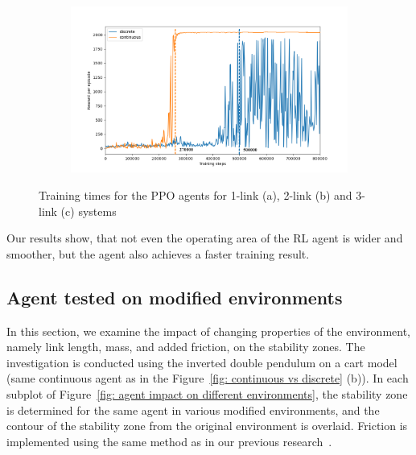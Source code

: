 \begin{figure}[h!]
\begin{subfigure}[t]{0.48\textwidth}
		\label{fig: dp - training time}
		\caption{}
	\end{subfigure}
	\begin{subfigure}[t]{0.48\textwidth}
		\centering
		\includegraphics[width=\textwidth]{Figures/TP_discrete_vs_continuous_training_time.png}
		\label{fig: tp - training time}
		\caption{}
	\end{subfigure}
	
	\caption{Training times for the PPO agents for 1-link (a), 2-link (b) and 3-link (c) systems}
	\label{fig: training time comparison}
\end{figure}

Our results show, that not even the operating area of the RL agent is wider and smoother, but the agent also achieves a faster training result. 

\subsection{Agent tested on modified environments} \label{subsec: Agent tested on modified environments}
In this section, we examine the impact of changing properties of the environment, namely
link length, mass, and added friction, on the stability zones. The investigation is conducted
using the inverted double pendulum on a cart model (same continuous agent as in the Figure~\ref{fig: continuous vs discrete} (b)). In each subplot of Figure~\ref{fig: agent impact on different environments}, the stability zone is determined for the same agent in various modified environments, and the contour of the stability zone from the original environment is overlaid. Friction is implemented using the same method as in our previous research~\cite{manzl2023relrl}.

